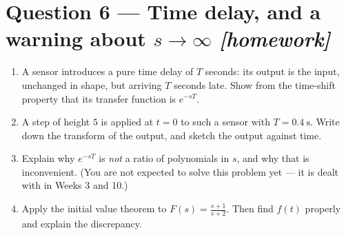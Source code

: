 \documentclass[11pt,a4paper]{article}
\newcommand{\athome}{\hfill{\small\color{fflag}\itshape[homework]}}
\begin{document}
\section*{Question 6 --- Time delay, and a warning about $s\to\infty$ \athome}

\begin{enumerate}[label=(\alph*)]
\item A sensor introduces a pure time delay of $T$ seconds: its output is the
      input, unchanged in shape, but arriving $T$ seconds late. Show from the
      time-shift property that its transfer function is $e^{-sT}$.

\item A step of height $5$ is applied at $t=0$ to such a sensor with
      $T=\SI{0.4}{\second}$. Write down the transform of the output, and sketch
      the output against time.

\item Explain why $e^{-sT}$ is \emph{not} a ratio of polynomials in $s$, and
      why that is inconvenient. (You are not expected to solve this problem
      yet --- it is dealt with in Weeks 3 and 10.)

\item Apply the initial value theorem to $\displaystyle F(s)=\frac{s+1}{s+2}$.
      Then find $f(t)$ properly and explain the discrepancy.
\end{enumerate}
\end{document}
